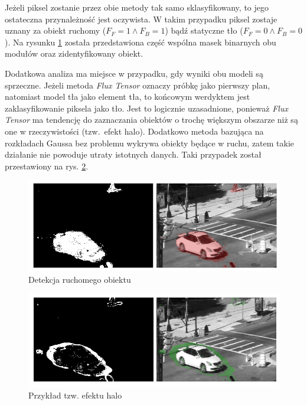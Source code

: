 \documentclass[10pt,a4paper]{article}
\begin{document}
Jeżeli piksel zostanie przez obie metody tak samo sklasyfikowany, to jego ostateczna przynależność jest oczywista. W takim przypadku piksel zostaje uznany za obiekt ruchomy ($F_F = 1 \land F_B = 1$) bądź statyczne tło ($F_F = 0 \land F_B = 0$). Na rysunku \ref{fig:ftsg_moving_obj} została przedstawiona część wspólna masek binarnych obu modułów oraz zidentyfikowany obiekt. 

Dodatkowa analiza ma miejsce w przypadku, gdy wyniki obu modeli są sprzeczne. Jeżeli metoda \textit{Flux Tensor} oznaczy próbkę jako pierwszy plan, natomiast model tła jako element tła, to końcowym werdyktem jest zaklasyfikowanie piksela jako tło. Jest to logicznie uzasadnione, ponieważ \textit{Flux Tensor} ma tendencję do zaznaczania obiektów o trochę większym obszarze niż są one w rzeczywistości (tzw.~efekt halo). Dodatkowo metoda bazująca na rozkładach Gaussa bez problemu wykrywa obiekty będące w ruchu, zatem takie działanie nie powoduje utraty istotnych danych. Taki przypadek został przestawiony na rys. \ref{fig:ftsg_halo}.

		\begin{figure}[h]
				\centering
				\includegraphics[scale=0.65]{img/ftsg_moving_obj.png}
				\caption{Detekcja ruchomego obiektu}
				\label{fig:ftsg_moving_obj}
		\end{figure}
		
		\begin{figure}[h]
				\centering
				\includegraphics[scale=0.65]{img/ftsg_halo.png}
				\caption{Przykład tzw. efektu halo}
				\label{fig:ftsg_halo}
		\end{figure}
\end{document}
